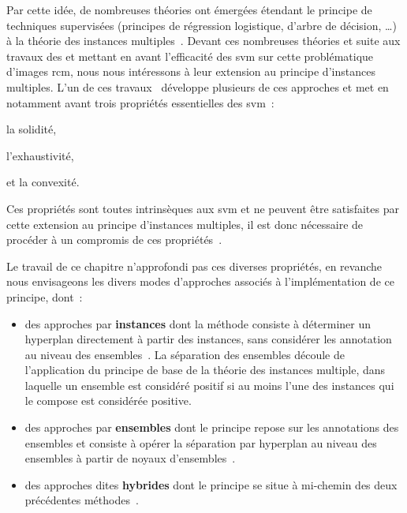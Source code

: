 Par cette idée, de nombreuses théories ont émergées étendant le principe de techniques supervisées (principes de régression logistique, d'arbre de décision, \ldots) à la théorie des instances multiples~\cite{Maron1998,Xu2004,Blockeel2005}. Devant ces nombreuses théories et suite aux travaux des  et  mettant en avant l'efficacité des \gls{svm} sur cette problématique d'images \gls{rcm}, nous nous intéressons à leur extension au principe d'instances multiples. L'un de ces travaux~\cite{Doran2014} développe plusieurs de ces approches et met en notamment avant trois propriétés essentielles des \gls{svm}~:
\begin{inlinerate}
    \item la solidité,
    \item l'exhaustivité,
    \item et la convexité.
\end{inlinerate} Ces propriétés sont toutes intrinsèques aux \gls{svm} et ne peuvent être satisfaites par cette extension au principe d'instances multiples, il est donc nécessaire de procéder à un compromis de ces propriétés~\cite{Doran2014}.\par

Le travail de ce chapitre n'approfondi pas ces diverses propriétés, en revanche nous envisageons les divers modes d'approches associés à l'implémentation de ce principe, dont~: 
\begin{itemize}
    \item des approches par \textbf{instances} dont la méthode consiste à déterminer un hyperplan directement à partir des instances, sans considérer les annotation au niveau des ensembles~\cite{Andrews2003}. La séparation des ensembles découle de l'application du principe de base de la théorie des instances multiple, dans laquelle un ensemble est considéré positif si au moins l'une des instances qui le compose est considérée positive.
    \item des approches par \textbf{ensembles} dont le principe repose sur les annotations des ensembles et consiste à opérer la séparation par hyperplan au niveau des ensembles à partir de noyaux d'ensembles~\cite{Gartner2002}.
    \item des approches dites \textbf{hybrides} dont le principe se situe à mi-chemin des deux précédentes méthodes~\cite{Bunescu2007}.
\end{itemize}\par 

